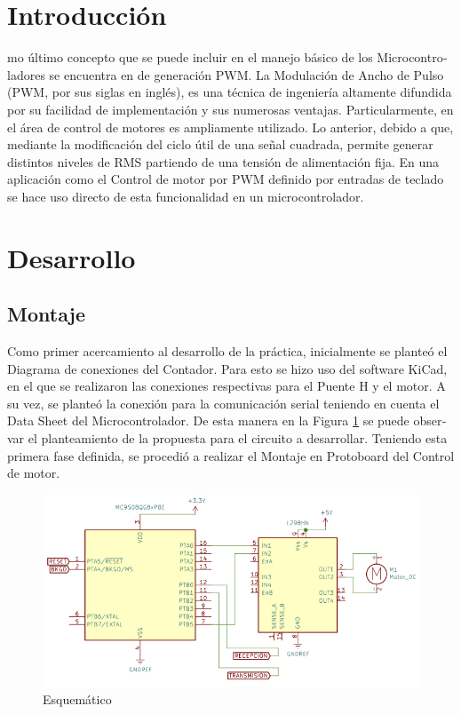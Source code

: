 \documentclass[journal]{IEEEtran}
\begin{document}
\begin{otherlanguage}{spanish}
\section{Introducción}
mo último concepto que se puede incluir en el manejo básico de los Microcontroladores se encuentra en de generación PWM. La Modulación de Ancho de Pulso (PWM, por sus siglas en inglés), es una técnica de ingeniería altamente difundida por su facilidad de implementación y sus numerosas ventajas. Particularmente, en el área de control de motores es ampliamente utilizado. Lo anterior, debido a que, mediante la modificación del ciclo útil de una señal cuadrada, permite generar distintos niveles de RMS partiendo de una tensión de alimentación fija. En una aplicación como el Control de motor por PWM definido por entradas de teclado se hace uso directo de esta funcionalidad en un microcontrolador.  

\section{Desarrollo}

\subsection{Montaje}
Como primer acercamiento al desarrollo de la práctica, inicialmente se planteó el Diagrama de conexiones del Contador. Para esto se hizo uso del software KiCad, en el que se realizaron las conexiones respectivas para el Puente H y el motor. A su vez, se planteó la conexión para la comunicación serial teniendo en cuenta el Data Sheet del Microcontrolador. De esta manera en la Figura \ref{E} se puede observar el planteamiento de la propuesta para el circuito a desarrollar. Teniendo esta primera fase definida, se procedió a realizar el Montaje en Protoboard del Control de motor.

\begin{figure}[H]
    \centering
    \includegraphics[scale=0.32]{Imágenes/Esquema6.jpg}
    \caption{Esquemático}
    \label{E}
\end{figure}


\end{otherlanguage}
\end{document}
